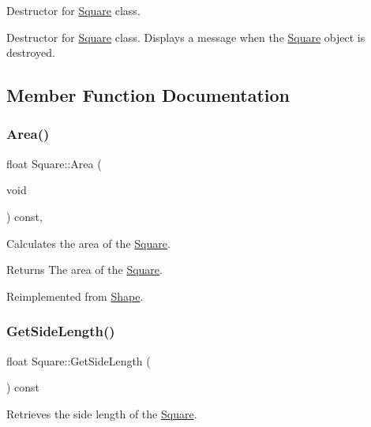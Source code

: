 Destructor for \mbox{\hyperlink{class_square}{Square}} class. 

Destructor for \mbox{\hyperlink{class_square}{Square}} class. Displays a message when the \mbox{\hyperlink{class_square}{Square}} object is destroyed. 

\subsection{Member Function Documentation}
\mbox{\label{class_square_a514f98666ebe6c9d43bc454e3d5819a4}} 
\subsubsection{\texorpdfstring{Area()}{Area()}}
{\footnotesize\ttfamily float Square\+::\+Area (\begin{DoxyParamCaption}\item[{void}]{ }\end{DoxyParamCaption}) const\hspace{0.3cm}{\ttfamily [override]}, {\ttfamily [virtual]}}



Calculates the area of the \mbox{\hyperlink{class_square}{Square}}. 

\begin{DoxyReturn}{Returns}
The area of the \mbox{\hyperlink{class_square}{Square}}. 
\end{DoxyReturn}


Reimplemented from \mbox{\hyperlink{class_shape_ad0c742cb695fdb3e575a31bcd4784c26}{Shape}}.

\mbox{\label{class_square_a84b60d7f474609a2772a1d4213bcc7d9}} 
\subsubsection{\texorpdfstring{GetSideLength()}{GetSideLength()}}
{\footnotesize\ttfamily float Square\+::\+Get\+Side\+Length (\begin{DoxyParamCaption}{ }\end{DoxyParamCaption}) const}



Retrieves the side length of the \mbox{\hyperlink{class_square}{Square}}. 

